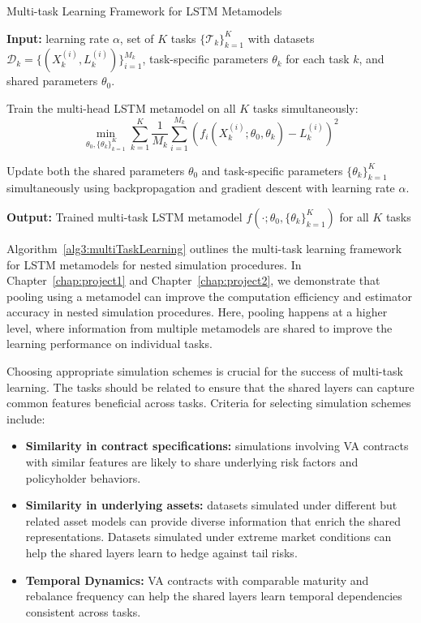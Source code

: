 \begin{algorithm}
    \caption{Multi-task Learning Framework for LSTM Metamodels}
    \begin{algorithmic}[1] \label{alg3:multiTaskLearning}
        \STATE \textbf{Input:} learning rate $\alpha$, set of $K$ tasks $\{\mathcal{T}_k\}_{k=1}^K$ with datasets $\mathcal{D}_k = \{(X_k^{(i)}, L_k^{(i)})\}_{i=1}^{M_k}$, task-specific parameters $\theta_k$ for each task $k$, and shared parameters $\theta_0$.
    
        \STATE Train the multi-head LSTM metamodel on all $K$ tasks simultaneously:
        \begin{equation}
            \min_{\theta_0, \{\theta_k\}_{k=1}^K} \sum_{k=1}^K \frac{1}{M_k} \sum_{i=1}^{M_k} \left( f_i(X_k^{(i)}; \theta_0, \theta_k) - L_k^{(i)} \right)^2
        \end{equation}
    
        \STATE Update both the shared parameters $\theta_0$ and task-specific parameters $\{\theta_k\}_{k=1}^K$ simultaneously using backpropagation and gradient descent with learning rate $\alpha$.
        
        \STATE \textbf{Output:} Trained multi-task LSTM metamodel $f(\cdot; \theta_0, \{\theta_k\}_{k=1}^K)$ for all $K$ tasks
    \end{algorithmic}
\end{algorithm}

Algorithm~\ref{alg3:multiTaskLearning} outlines the multi-task learning framework for LSTM metamodels for nested simulation procedures.
In Chapter~\ref{chap:project1} and Chapter~\ref{chap:project2}, we demonstrate that pooling using a metamodel can improve the computation efficiency and estimator accuracy in nested simulation procedures.
Here, pooling happens at a higher level, where information from multiple metamodels are shared to improve the learning performance on individual tasks.

Choosing appropriate simulation schemes is crucial for the success of multi-task learning. The tasks should be related to ensure that the shared layers can capture common features beneficial across tasks. 
Criteria for selecting simulation schemes include:

\begin{itemize} 
    \item   \textbf{Similarity in contract specifications:} 
            simulations involving VA contracts with similar features are likely to share underlying risk factors and policyholder behaviors. 
    \item   \textbf{Similarity in underlying assets:} 
            datasets simulated under different but related asset models can provide diverse information that enrich the shared representations.
            Datasets simulated under extreme market conditions can help the shared layers learn to hedge against tail risks.
    \item   \textbf{Temporal Dynamics:} 
            VA contracts with comparable maturity and rebalance frequency can help the shared layers learn temporal dependencies consistent across tasks. 
\end{itemize}

